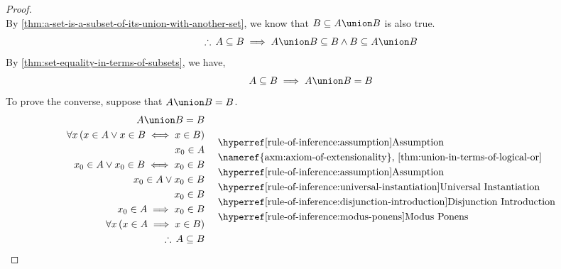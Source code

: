 \begin{proof}
\begin{equation*}
    \end{equation*}
    By \cref{thm:a-set-is-a-subset-of-its-union-with-another-set}, we know that
    \( B \subseteq A \union B \) is also true.
    \begin{equation*}
        \therefore \, A \subseteq B \implies A \union B \subseteq B \land
        B \subseteq A \union B
    \end{equation*}
    By \cref{thm:set-equality-in-terms-of-subsets}, we have,
    \begin{equation}
        \label{eq:A-subset-B-implies-A-union-B-equals-B}
        A \subseteq B \implies A \union B = B
    \end{equation}
    To prove the converse, suppose that \( A \union B = B \).
    \begin{equation*}
        \begin{aligned}
            A \union B = B& \\
            \forall x \, \mleft( x \in A \lor x \in B \iff x \in B \mright)& \\
            x_{0} \in A& \\
            x_{0} \in A \lor x_{0} \in B \iff x_{0} \in B& \\
            x_{0} \in A \lor x_{0} \in B& \\
            x_{0} \in B& \\
            x_{0} \in A \implies x_{0} \in B& \\
            \forall x \, \mleft( x \in A \implies x \in B \mright)& \\
            \therefore \, A \subseteq B& \\
        \end{aligned}
        \text{  }
        \begin{aligned}
            &\quad\text{\aref{rule-of-inference:assumption}{Assumption}}\\
            &\quad\text{\nameref{axm:axiom-of-extensionality}, \cref{thm:union-in-terms-of-logical-or}}\\
            &\quad\text{\aref{rule-of-inference:assumption}{Assumption}}\\
            &\quad\text{\aref{rule-of-inference:universal-instantiation}{Universal Instantiation}}\\
            &\quad\text{\aref{rule-of-inference:disjunction-introduction}{Disjunction Introduction}}\\
            &\quad\text{\aref{rule-of-inference:modus-ponens}{Modus Ponens}}\\

\end{aligned}
\end{equation*}
\end{proof}
